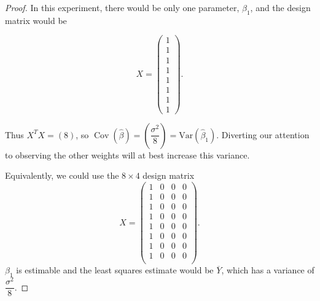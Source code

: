 \documentclass[12pt]{article}
\DeclareMathOperator*{\Cov}{Cov}
\begin{document}
\begin{enumerate}[leftmargin=0cm,itemindent=.5cm,labelwidth=\itemindent,labelsep=0cm,align=left]
\begin{proof}
In this experiment, there would be only one parameter, $\beta_1$, and the design matrix would be

$$X =
\left(
\begin{matrix}
1 \\ 1 \\ 1 \\ 1 \\ 1 \\ 1 \\ 1 \\ 1
\end{matrix}
\right).
$$

\noindent Thus $X^T X = (8)$, so $\Cov(\hat{\beta}) = \left(\dfrac{\sigma^2}{8} \right) = \text{Var}(\hat{\beta}_1)$.  Diverting our attention to observing the other weights will at best increase this variance.

Equivalently, we could use the $8 \times 4$ design matrix
$$X = 
\left(
\begin{matrix}
1 & 0 & 0 & 0 \\
1 & 0 & 0 & 0 \\
1 & 0 & 0 & 0 \\
1 & 0 & 0 & 0 \\
1 & 0 & 0 & 0 \\
1 & 0 & 0 & 0 \\
1 & 0 & 0 & 0 \\
1 & 0 & 0 & 0 \\
\end{matrix}
\right).
$$
$\beta_1$ is estimable and the least squares estimate would be $\overline{Y}$, which has a variance of $\dfrac{\sigma^2}{8}$.
\end{proof}

\end{enumerate}
\end{document}
